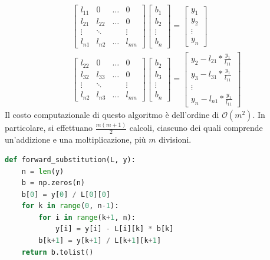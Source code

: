 \documentclass{article}
\begin{document}
\begin{equation*}
   \begin{aligned}
       &\begin{bmatrix}
           l_{11} & 0 & \ldots & 0 \\ 
           l_{21} & l_{22} & \ldots & 0 \\ 
           \vdots & \ddots & & \vdots \\ 
           l_{n1} & l_{n2} & \ldots & l_{nm}
       \end{bmatrix}
       \begin{bmatrix}
           b_1 \\ 
           b_2 \\ 
           \vdots \\ 
           b_n
       \end{bmatrix}= 
       \begin{bmatrix}
           y_1 \\ 
           y_2 \\ 
           \vdots \\ 
           y_n
       \end{bmatrix}\\
       &\begin{bmatrix}
           l_{22} & 0 & \ldots & 0 \\ 
           l_{32} & l_{33} & \ldots & 0 \\ 
           \vdots & \ddots & & \vdots \\ 
           l_{n2} & l_{n3} & \ldots & l_{nm}
       \end{bmatrix}
       \begin{bmatrix}
           b_2 \\ 
           b_3 \\ 
           \vdots \\ 
           b_n
       \end{bmatrix}= 
       \begin{bmatrix}
           y_2 - l_{21} *\frac{y_1}{l_{11}}  \\ 
           y_3 - l_{31} *\frac{y_1}{l_{11}} \\ 
           \vdots \\ 
           y_n - l_{n1} *\frac{y_1}{l_{11}}
       \end{bmatrix}
   \end{aligned} 
\end{equation*}
Il costo computazionale di questo algoritmo è dell'ordine di
$\mathcal{O}(m^2)$. In particolare, si effettuano $\frac{m(m+1)}{2}$ calcoli,
ciascuno dei quali comprende un'addizione e una moltiplicazione,
più $m$ divisioni.
\begin{lstlisting}[language=Python]
def forward_substitution(L, y):
    n = len(y)
    b = np.zeros(n)
    b[0] = y[0] / L[0][0]
    for k in range(0, n-1):
        for i in range(k+1, n):
            y[i] = y[i] - L[i][k] * b[k]
        b[k+1] = y[k+1] / L[k+1][k+1]
    return b.tolist()
\end{lstlisting}
\end{document}
